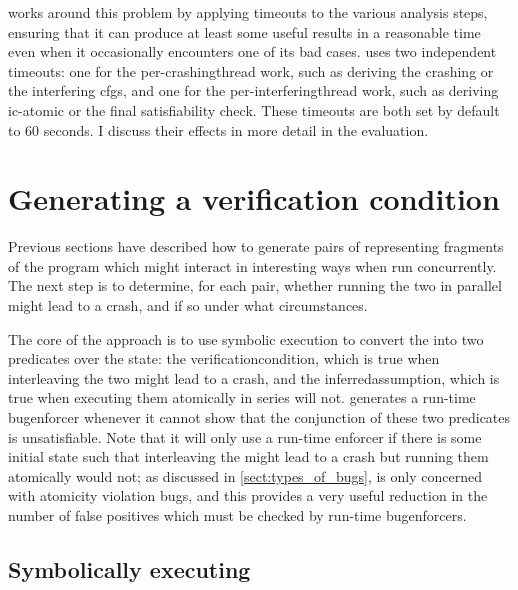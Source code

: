 {\Technique} works around this problem by applying timeouts to the
various analysis steps, ensuring that it can produce at least some
useful results in a reasonable time even when it occasionally
encounters one of its bad cases.  {\Implementation} uses two
independent timeouts: one for the per-\gls{crashingthread} work, such
as deriving the crashing {\StateMachine} or the interfering
\glspl{cfg}, and one for the per-\gls{interferingthread} work, such as
deriving \gls{ic-atomic} or the final satisfiability check.  These
timeouts are both set by default to 60 seconds.  I discuss their
effects in more detail in the evaluation.

\section{Generating a verification condition}
\label{sect:using:check_realness}

Previous sections have described how to generate pairs of
{\StateMachines} representing fragments of the program which might
interact in interesting ways when run concurrently.  The next step is
to determine, for each pair, whether running the two {\StateMachines}
in parallel might lead to a crash, and if so under what circumstances.

The core of the approach is to use symbolic execution\cite{King1976}
to convert the {\StateMachines} into two predicates over the
{\StateMachine} state: the \gls{verificationcondition}, which is true
when interleaving the two {\StateMachines} might lead to a crash, and
the \gls{inferredassumption}, which is true when executing them
atomically in series will not.  {\Technique} generates a run-time
\gls{bugenforcer} whenever it cannot show that the conjunction of
these two predicates is unsatisfiable.  Note that it will only use a
run-time enforcer if there is some initial state such that
interleaving the {\StateMachines} might lead to a crash but running
them atomically would not; as discussed in
\autoref{sect:types_of_bugs}, {\technique} is only concerned with
atomicity violation bugs, and this provides a very useful reduction in
the number of false positives which must be checked by run-time
\glspl{bugenforcer}.

\subsection{Symbolically executing {\StateMachines}}
\label{sect:derive:symbolic_execute}


